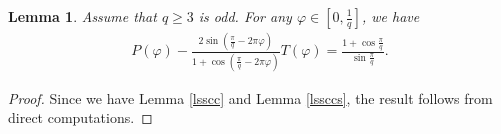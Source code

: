 \documentclass[12pt]{amsart}
\theoremstyle{plain}
\newtheorem{lemma}[theorem]{Lemma}
\theoremstyle{definition}
\begin{document}
		\begin{lemma} Assume that $q\geq3$ is odd. For any $\varphi\in\left[0,\frac{1}{q}\right]$, we have
		\begin{align}\label{ghs0}
			P(\varphi)-\frac{2\sin\left(\frac{\pi}{q}-2\pi\varphi\right)}{1+\cos\left(\frac{\pi}{q}-2\pi\varphi\right)}T(\varphi)=\frac{1+\cos\frac{\pi}{q}}{\sin\frac{\pi}{q}}.
		\end{align}
	\end{lemma}
	\begin{proof} Since we have Lemma \ref{lsscc} and Lemma \ref{lssccs}, the result follows from direct computations.

\end{proof}
\end{document}

